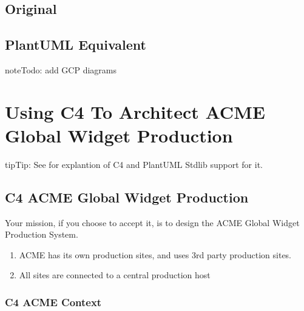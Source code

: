 \documentclass[letterpaper,10pt,english]{sphinxmanual}
\begin{document}
\subsection{Original}
\label{\detokenize{gcp/gcp:original}}

\subsection{PlantUML Equivalent}
\label{\detokenize{gcp/gcp:plantuml-equivalent}}
\begin{sphinxadmonition}{note}{\label{\detokenize{gcp/gcp:id1}}Todo:}
add GCP diagrams
\end{sphinxadmonition}


\section{Using C4 To Architect ACME Global Widget Production}
\label{\detokenize{C4/c4acme:using-c4-to-architect-acme-global-widget-production}}\label{\detokenize{C4/c4acme:c4acme-label}}\label{\detokenize{C4/c4acme::doc}}
\begin{sphinxadmonition}{tip}{Tip:}
See {\hyperref[\detokenize{C4/C4Stdlib:c4plantuml-label}]{}} for explantion of C4 and PlantUML Stdlib support for it.
\end{sphinxadmonition}


\subsection{C4 ACME Global Widget Production}
\label{\detokenize{C4/c4acme:c4-acme-global-widget-production}}
Your mission, if you choose to accept it, is to design the ACME Global Widget Production System.
\begin{enumerate}
%
\item {} 
ACME has its own production sites, and uses 3rd party production sites.

\item {} 
All sites are connected to a central production host

\end{enumerate}


\subsubsection{C4 ACME Context}
\label{\detokenize{C4/c4acme:c4-acme-context}}
\end{document}
